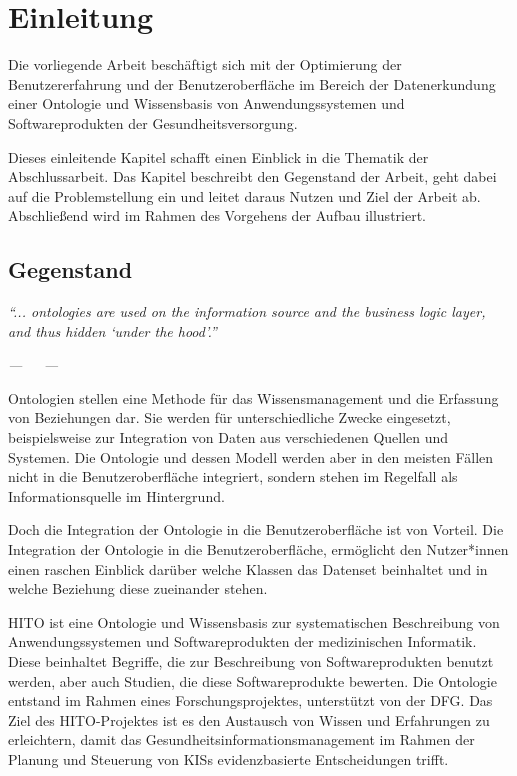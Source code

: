 \chapter{Einleitung}\label{ch:introduction}

Die vorliegende Arbeit beschäftigt sich mit der Optimierung der Benutzererfahrung und der Benutzeroberfläche im Bereich der Datenerkundung einer Ontologie und Wissensbasis von Anwendungssystemen und Softwareprodukten der Gesundheitsversorgung.

Dieses einleitende Kapitel schafft einen Einblick in die Thematik der Abschlussarbeit. 
Das Kapitel beschreibt den Gegenstand der Arbeit, geht dabei auf die Problemstellung ein und leitet daraus Nutzen und Ziel der Arbeit ab.
Abschließend wird im Rahmen des Vorgehens der Aufbau illustriert.

\section{Gegenstand}\label{sec:gegenstand}

\begin{center}
\textit{\enquote{... ontologies are used on the information source and the business logic layer, and thus hidden \enquote{under the hood}.}}
\end{center}

\begin{flushright}
\textit{---~~\cite{paulheim2010ontology}~---} \newline
\end{flushright}

Ontologien stellen eine Methode für das Wissensmanagement und die Erfassung von Beziehungen dar.
Sie werden für unterschiedliche Zwecke eingesetzt, beispielsweise zur Integration von Daten aus verschiedenen Quellen und Systemen.
Die Ontologie und dessen Modell werden aber in den meisten Fällen nicht in die Benutzeroberfläche integriert, sondern stehen im Regelfall als Informationsquelle im Hintergrund. \citep[vgl.]{paulheim2010ontology}

Doch die Integration der Ontologie in die Benutzeroberfläche ist von Vorteil. 
Die Integration der Ontologie in die Benutzeroberfläche, ermöglicht den Nutzer*innen einen raschen Einblick darüber welche Klassen das Datenset beinhaltet und in welche Beziehung diese zueinander stehen. \citep[vgl.]{linkeddatavisualization}

\ac{HITO} ist eine Ontologie und Wissensbasis zur systematischen Beschreibung von Anwendungssystemen und Softwareprodukten der medizinischen Informatik.
Diese beinhaltet Begriffe, die zur Beschreibung von Softwareprodukten benutzt werden, aber auch Studien, die diese Softwareprodukte bewerten.
Die Ontologie entstand im Rahmen eines Forschungsprojektes, unterstützt von der \ac{DFG}.
Das Ziel des HITO-Projektes ist es den Austausch von Wissen und Erfahrungen zu erleichtern, damit das Gesundheitsinformationsmanagement im Rahmen der Planung und Steuerung von \acp{KIS} evidenzbasierte Entscheidungen trifft.

